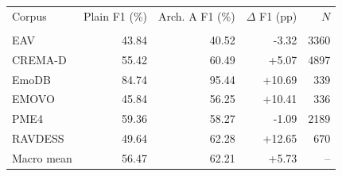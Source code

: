 \begin{tabular}{lrrrr}
\hline
Corpus & Plain F1 (\%) & Arch. A F1 (\%) & $\Delta$ F1 (pp) & $N$ \\\\
\hline
EAV & 43.84 & 40.52 & -3.32 & 3360 \\
CREMA-D & 55.42 & 60.49 & +5.07 & 4897 \\
EmoDB & 84.74 & 95.44 & +10.69 & 339 \\
EMOVO & 45.84 & 56.25 & +10.41 & 336 \\
PME4 & 59.36 & 58.27 & -1.09 & 2189 \\
RAVDESS & 49.64 & 62.28 & +12.65 & 670 \\
\hline
Macro mean & 56.47 & 62.21 & +5.73 & -- \\
\hline
\end{tabular}